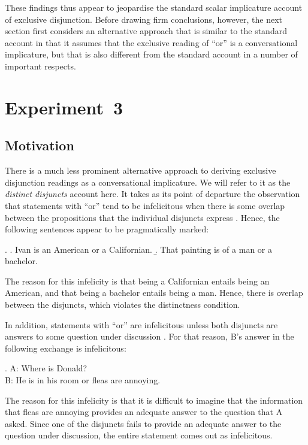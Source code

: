 \documentclass[12pt]{article}
\begin{document}
These findings thus appear to jeopardise the standard scalar implicature account of exclusive
disjunction. Before drawing firm conclusions, however, the next section first considers an
alternative approach that is similar to the standard account in that it assumes that the
exclusive reading of ``or'' is a conversational implicature, but that is also different from
the standard account in a number of important respects.



\section{Experiment~3}

\subsection*{Motivation}

There is a much less prominent alternative approach to deriving exclusive disjunction readings
as a conversational implicature. We will refer to it as the \emph{distinct disjuncts} account
here. It takes as its point of departure the observation that statements with ``or'' tend to be
infelicitous when there is some overlap between the propositions that the individual disjuncts
express \citep{hurford1974, simons2001, ZimmermannFreeChoiceDisjunction2000}. Hence, the
following sentences appear to be pragmatically marked:

\ex.	\a. \label{ex:hurford} Ivan is an American or a Californian.
	\b. That painting is of a man or a bachelor.
	
The reason for this infelicity is that being a Californian entails being an American, and that being a bachelor entails being a man. Hence, there is overlap between the disjuncts, which violates the distinctness condition.

In addition, statements with ``or'' are infelicitous unless both disjuncts are answers to some question under discussion \citep{simons2001}. For that reason, B's answer in the following exchange is infelicitous:

\ex.	A: Where is Donald? \\ B: He is in his room or fleas are annoying.

The reason for this infelicity is that it is difficult to imagine that the information that fleas are annoying provides an adequate answer to the question that A asked. Since one of the disjuncts fails to provide an adequate answer to the question under discussion, the entire statement comes out as infelicitous.
\end{document}
